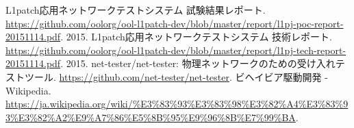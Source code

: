 
\begin{thebibliography}{99}
         L1patch応用ネットワークテストシステム 試験結果レポート.
         \url{https://github.com/oolorg/ool-l1patch-dev/blob/master/report/l1pj-poc-report-20151114.pdf}.
         2015.
         L1patch応用ネットワークテストシステム 技術レポート.
         \url{https://github.com/oolorg/ool-l1patch-dev/blob/master/report/l1pj-tech-report-20151114.pdf}.
         2015.
         net-tester/net-tester: 物理ネットワークのための受け入れテストツール.
         \url{https://github.com/net-tester/net-tester}.
         ビヘイビア駆動開発 - Wikipedia.
         \url{https://ja.wikipedia.org/wiki/%E3%83%93%E3%83%98%E3%82%A4%E3%83%93%E3%82%A2%E9%A7%86%E5%8B%95%E9%96%8B%E7%99%BA}.
\end{thebibliography}

